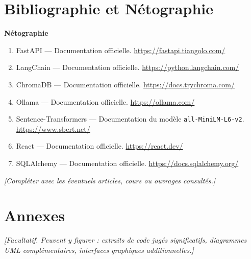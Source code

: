 \documentclass[12pt,a4paper]{report}
\newcommand{\note}[1]{\textit{[#1]}}
\begin{document}
\chapter*{Bibliographie et Nétographie}

\textbf{Nétographie}

\begin{enumerate}
  \item FastAPI — Documentation officielle. \url{https://fastapi.tiangolo.com/}
  \item LangChain — Documentation officielle. \url{https://python.langchain.com/}
  \item ChromaDB — Documentation officielle. \url{https://docs.trychroma.com/}
  \item Ollama — Documentation officielle. \url{https://ollama.com/}
  \item Sentence-Transformers — Documentation du modèle \texttt{all-MiniLM-L6-v2}. \url{https://www.sbert.net/}
  \item React — Documentation officielle. \url{https://react.dev/}
  \item SQLAlchemy — Documentation officielle. \url{https://docs.sqlalchemy.org/}
\end{enumerate}

\note{Compléter avec les éventuels articles, cours ou ouvrages consultés.}

\appendix
\chapter{Annexes}
\note{Facultatif. Peuvent y figurer : extraits de code jugés significatifs, diagrammes UML complémentaires, interfaces graphiques additionnelles.}
\end{document}
